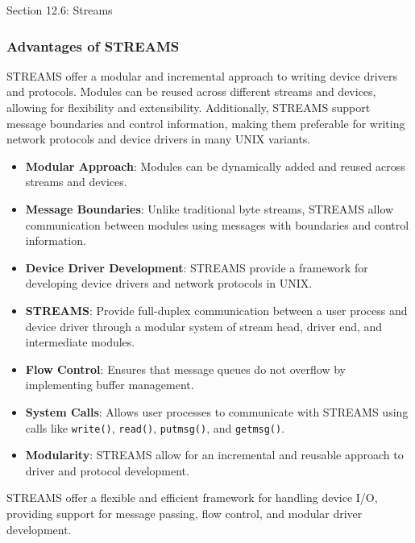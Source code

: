 \begin{notes}{Section 12.6: Streams}
\begin{highlight}
    \end{highlight}
    
    \subsubsection*{Advantages of STREAMS}
    
    STREAMS offer a modular and incremental approach to writing device drivers and protocols. Modules can be reused across different streams and devices, allowing for flexibility and extensibility. 
    Additionally, STREAMS support message boundaries and control information, making them preferable for writing network protocols and device drivers in many UNIX variants.
    
    \begin{highlight}
    
        \begin{itemize}
            \item \textbf{Modular Approach}: Modules can be dynamically added and reused across streams and devices.
            \item \textbf{Message Boundaries}: Unlike traditional byte streams, STREAMS allow communication between modules using messages with boundaries and control information.
            \item \textbf{Device Driver Development}: STREAMS provide a framework for developing device drivers and network protocols in UNIX.
        \end{itemize}
    
    \end{highlight}
    
    \begin{highlight}
    
        \begin{itemize}
            \item \textbf{STREAMS}: Provide full-duplex communication between a user process and device driver through a modular system of stream head, driver end, and intermediate modules.
            \item \textbf{Flow Control}: Ensures that message queues do not overflow by implementing buffer management.
            \item \textbf{System Calls}: Allows user processes to communicate with STREAMS using calls like \texttt{write()}, \texttt{read()}, \texttt{putmsg()}, and \texttt{getmsg()}.
            \item \textbf{Modularity}: STREAMS allow for an incremental and reusable approach to driver and protocol development.
        \end{itemize}
    
    STREAMS offer a flexible and efficient framework for handling device I/O, providing support for message passing, flow control, and modular driver development.
    
    \end{highlight}
\end{notes}


